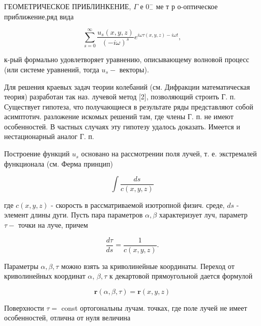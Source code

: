 \documentclass[10pt]{article}
\begin{document}
ГЕОМЕТРИЧЕСКОЕ ПРИБЛИНКЕНИЕ, $\Gamma$ е $0_{-}^{-}$ ме т р о-оптическое приближение,ряд вида



\[

\sum_{s=0}^{\infty} \frac{u_{s}(x, y, z)}{(-i \omega)^{s}} e^{i \omega \tau(x, y, z)-i \omega t},

\]



к-рый формально удовлетворяет уравнению, описывающему волновой процесс (или системе уравнений, тогда $u_{s}-$ векторы).



Для решения краевых задач теории колебаний (см. Дифракции математическая теория) разработан так наз. лучевой метод [2], позволяющий строить Г. п. Существует гипотеза, что получающиеся в результате ряды представляют собой асимптотич. разложение искомых решений там, где члены Г. п. не имеют особенностей. В частных случаях эту гипотезу удалось доказать. Имеется и нестационарный аналог Г. п.



Построение функций $u_{s}$ основано на рассмотрении поля лучей, т. е. экстремалей функционала (см. Ферма принцип)



\[

\int \frac{d s}{c(x, y, z)}

\]



где $c(x, y, z)$ - скорость в рассматриваемой изотропной физич. среде, $d s$ - элемент длины дуги. Пусть пара параметров $\alpha, \beta$ характеризует луч, параметр $\tau-$ точки на луче, причем



\[

\frac{d \tau}{d s}=\frac{1}{c(x, y, z)} .

\]



Параметры $\alpha, \beta, \tau$ можно взять за криволинейные координаты. Переход от криволинейных координат $\alpha$, $\beta, \tau$ к декартовой прямоугольной дается формулой



\[

\boldsymbol{r}(\alpha, \beta, \tau)=\boldsymbol{r}(x, y, z)

\]



Поверхности $\tau=$ const ортогональны лучам. точках, где поле лучей не имеет особенностей, отлична от нуля величина
\end{document}
